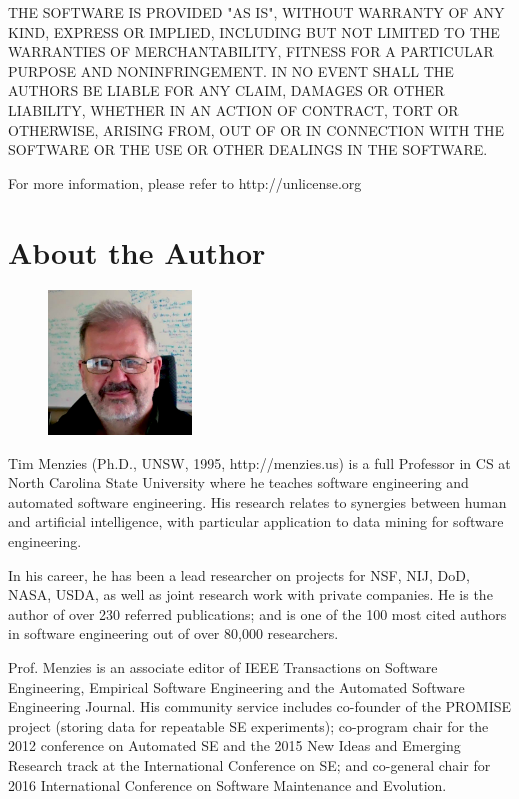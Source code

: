 \documentclass[9pt,twocolumn]{article}
\begin{document}
THE SOFTWARE IS PROVIDED "AS IS", WITHOUT WARRANTY OF ANY KIND,
EXPRESS OR IMPLIED, INCLUDING BUT NOT LIMITED TO THE WARRANTIES OF
MERCHANTABILITY, FITNESS FOR A PARTICULAR PURPOSE AND NONINFRINGEMENT.
IN NO EVENT SHALL THE AUTHORS BE LIABLE FOR ANY CLAIM, DAMAGES OR
OTHER LIABILITY, WHETHER IN AN ACTION OF CONTRACT, TORT OR OTHERWISE,
ARISING FROM, OUT OF OR IN CONNECTION WITH THE SOFTWARE OR THE USE OR
OTHER DEALINGS IN THE SOFTWARE.

For more information, please refer to http://unlicense.org


\section*{About the Author}

\begin{figure}
\includegraphics[width=1.5in]{img/tim.png}
\end{figure}
Tim Menzies (Ph.D., UNSW, 1995, http://menzies.us) is a full Professor in CS at North Carolina State University where he teaches software engineering and automated software engineering. His research relates to synergies between human and artificial intelligence, with particular application to data mining for software engineering.

In his career, he has been a lead researcher on projects for NSF, NIJ, DoD, NASA, USDA, as well as joint research work with private companies.
He is the author of over 230 referred publications; and is one of the 100 most cited authors in software engineering out of over 80,000 researchers.

Prof. Menzies is an associate editor of IEEE
Transactions on Software Engineering, Empirical
Software Engineering and the Automated Software
Engineering Journal. His community service includes
co-founder of the PROMISE project (storing data for repeatable SE
experiments);
co-program chair for the 2012 conference on Automated SE and the 2015
New Ideas and Emerging Research track at the International Conference on SE;
and 
co-general chair for 2016 International Conference on Software Maintenance and Evolution.
\end{document}
